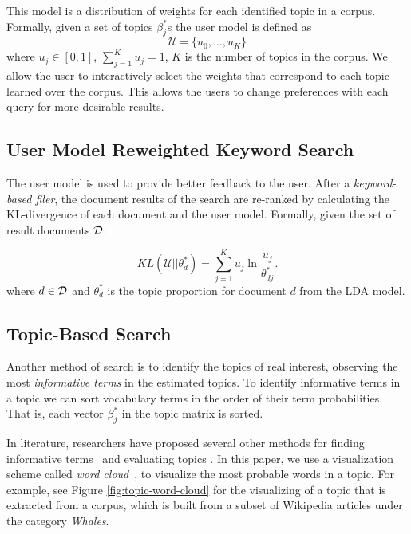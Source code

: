 This model is a distribution of weights for each identified topic in 
a corpus. Formally, given a set of topics $\beta_j^{*}$s the user 
model is defined as
$$
\mathcal{U} = \{u_0, \ldots, u_{K}\}
$$
where $u_j \in [0,1]$, $\sum_{j = 1}^K u_j = 1$, $K$ is the number 
of topics in the corpus.
We allow the user to interactively select the weights that correspond to
each topic learned over the corpus. This allows the users to change preferences with each query
for more desirable results.

\subsection{User Model Reweighted Keyword Search}
The user model is used to provide better feedback to
the user. After a \textsl{keyword-based filer}, the document results of the search 
are re-ranked by calculating the KL-divergence of each document and the
user model. Formally, given the set of result documents $\cal D$:

\begin{equation} \label{eq:KL}
KL(\mathcal{U}||\theta^*_{d}) = \sum_{j = 1}^K u_j \ln \frac{u_j}{\theta^*_{dj}}.
\end{equation}
where $d \in {\cal D}$ and $\theta^*_{d}$ is the topic proportion 
for document $d$ from the LDA model. 


\subsection{Topic-Based Search}

Another method of search is to identify the topics of 
real interest, observing the most \textsl{informative terms} in 
the estimated topics. 
To identify informative terms in a topic we can sort vocabulary 
terms in the order of their term probabilities.
That is, each vector $\beta_j^{*}$ in the topic matrix is sorted.
  
In literature, researchers have proposed several other methods for 
finding informative terms~\cite{2012-termite} and evaluating topics 
\cite{mimno2011optimizing}. In this paper, we use a visualization 
scheme called \textsl{word cloud}~\cite{Davis2013}, to visualize the 
most probable words in a topic. For example, see Figure 
\ref{fig:topic-word-cloud} for the visualizing of a topic that is 
extracted from a corpus, which is built from a subset of Wikipedia 
articles under the category \textsl{Whales}. 
       
